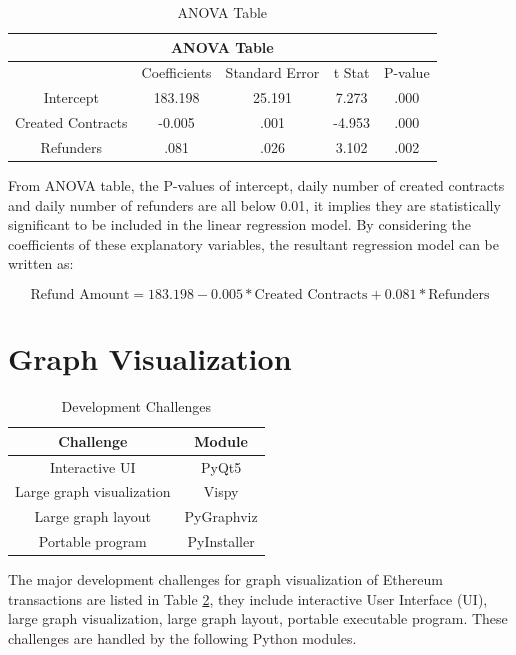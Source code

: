 \begin{table}[h]
\caption{ANOVA Table}
\label{tab:anova-table}
\begin{tabular}{c|c|c|c|c}
\hline
\multicolumn{5}{c}{ANOVA Table} \\
\hline
 & Coefficients & Standard Error & t Stat & P-value \\
\hline
Intercept & 183.198 & 25.191 & 7.273 & .000 \\
\hline
Created Contracts & -0.005 & .001 & -4.953 & .000 \\
\hline
Refunders & .081 & .026 & 3.102 & .002 \\
\hline
\end{tabular}
\end{table}

From ANOVA table, the P-values of intercept, daily number of created contracts and daily number of refunders are all below 0.01, it implies they are statistically significant to be included in the linear regression model. By considering the coefficients of these explanatory variables, the resultant regression model can be written as:

$$\text{Refund Amount} = 183.198 - 0.005 * \text{Created Contracts} + 0.081 * \text{Refunders}$$

\section{Graph Visualization}
\label{sec:methodology:view}

\begin{table}[h]
\caption{Development Challenges}
\label{tab:development-challenges}
\begin{tabular}{@{}cc@{}}
\toprule
Challenge & Module      \\
\midrule
Interactive UI & PyQt5       \\
Large graph visualization & Vispy       \\
Large graph layout & PyGraphviz  \\
Portable program & PyInstaller \\
\bottomrule
\end{tabular}
\end{table}

The major development challenges for graph visualization of Ethereum transactions are listed in Table \ref{tab:development-challenges}, they include interactive User Interface (UI), large graph visualization, large graph layout, portable executable program. These challenges are handled by the following Python modules.

